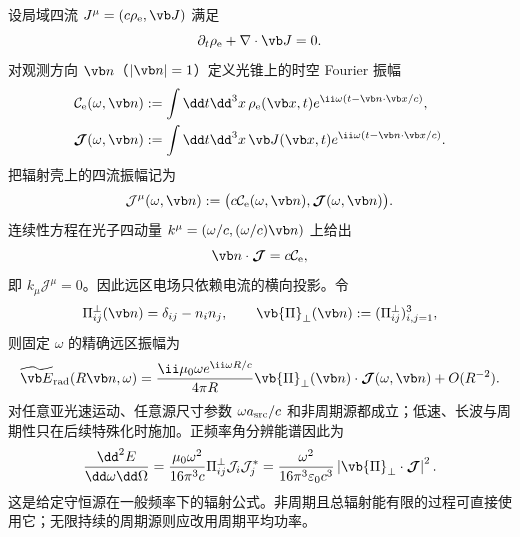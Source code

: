 设局域四流 \(J^\mu=(c\rho_{\rm e},\vb J)\) 满足
\begin{equation}
 \partial_t\rho_{\rm e}+\nabla\cdot\vb J=0.
 \label{eq:phys-rr-continuity}
\end{equation}
对观测方向 \(\vb n\)（\(|\vb n|=1\)）定义光锥上的时空 Fourier 振幅
\begin{align}
 \mathcal C_{\rm e}(\omega,\vb n)
 &:=\int\dd t\dd^3x\,
 \rho_{\rm e}(\vb x,t)e^{\ii\omega(t-\vb n\cdot\vb x/c)},\\
 \boldsymbol{\mathcal J}(\omega,\vb n)
 &:=\int\dd t\dd^3x\,
 \vb J(\vb x,t)e^{\ii\omega(t-\vb n\cdot\vb x/c)}.
 \label{eq:phys-rr-exact-current-amplitude}
\end{align}
把辐射壳上的四流振幅记为
\[
 \mathcal J^\mu(\omega,\vb n):=
 \bigl(c\mathcal C_{\rm e}(\omega,\vb n),\boldsymbol{\mathcal J}(\omega,\vb n)\bigr).
\]
连续性方程在光子四动量 \(k^\mu=(\omega/c,(\omega/c)\vb n)\) 上给出
\begin{equation}
 \vb n\cdot\boldsymbol{\mathcal J}=c\mathcal C_{\rm e},
 \label{eq:phys-rr-on-shell-current-conservation}
\end{equation}
即 \(k_\mu\mathcal J^\mu=0\)。因此远区电场只依赖电流的横向投影。令
\[
 \Pi^{\perp}_{ij}(\vb n)=\delta_{ij}-n_in_j,
 \qquad
 \vb{\Pi}_\perp(\vb n):=(\Pi^{\perp}_{ij})_{i,j=1}^{3},
\]
则固定 \(\omega\) 的精确远区振幅为
\begin{equation}
 \widetilde{\vb E}_{\rm rad}(R\vb n,\omega)
 =\frac{\ii\mu_0\omega e^{\ii\omega R/c}}{4\pi R}
 \vb{\Pi}_{\perp}(\vb n)\cdot\boldsymbol{\mathcal J}(\omega,\vb n)
 +O(R^{-2}).
 \label{eq:phys-rr-exact-far-field-current}
\end{equation}
 对任意亚光速运动、任意源尺寸参数 \(\omega a_{\rm src}/c\) 和非周期源都成立；低速、长波与周期性只在后续特殊化时施加。正频率角分辨能谱因此为
\begin{equation}
 \frac{\dd^2E}{\dd\omega\dd\Omega}
 =\frac{\mu_0\omega^2}{16\pi^3c}
 \Pi^{\perp}_{ij}\mathcal J_i\mathcal J_j^*
 =\frac{\omega^2}{16\pi^3\varepsilon_0c^3}
 \left|\vb{\Pi}_{\perp}\cdot\boldsymbol{\mathcal J}\right|^2.
 \label{eq:phys-rr-exact-radiation-spectrum-current}
\end{equation}
这是给定守恒源在一般频率下的辐射公式。非周期且总辐射能有限的过程可直接使用它；无限持续的周期源则应改用周期平均功率。

